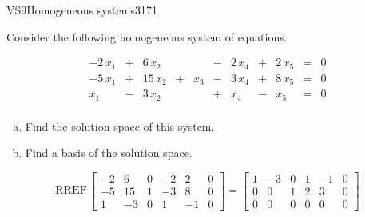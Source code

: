 \begin{exercise}{VS9}{Homogeneous systems}{3171} 
\begin{exerciseStatement} 

Consider the following homogeneous system of equations.

 \[\begin{matrix}
 -2 \, x_{1} &  +  & 6 \, x_{2} &  &  &  -  & 2 \, x_{4} &  +  & 2 \, x_{5} & = & 0 \\
 -5 \, x_{1} &  +  & 15 \, x_{2} &  +  & x_{3} &  -  & 3 \, x_{4} &  +  & 8 \, x_{5} & = & 0 \\
 x_{1} &  -  & 3 \, x_{2} &  &  &  +  & x_{4} &  -  & x_{5} & = & 0 \\
 \end{matrix}\] 

\begin{enumerate}[(a)]
\item  Find the solution space of this system.
\item  Find a basis of the solution space.
\end{enumerate}

     \end{exerciseStatement}
 \begin{exerciseAnswer} 

\[\mathrm{RREF}\,\left[\begin{array}{ccccc|c}
-2 & 6 & 0 & -2 & 2 & 0 \\
-5 & 15 & 1 & -3 & 8 & 0 \\
1 & -3 & 0 & 1 & -1 & 0
\end{array}\right]=\left[\begin{array}{ccccc|c}
1 & -3 & 0 & 1 & -1 & 0 \\
0 & 0 & 1 & 2 & 3 & 0 \\
0 & 0 & 0 & 0 & 0 & 0
\end{array}\right]\]

 


\end{exerciseAnswer}
\end{exercise}
